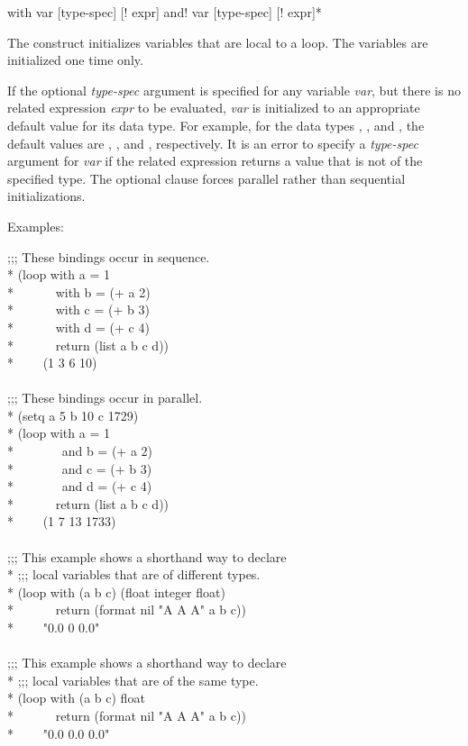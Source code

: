 \begin{defloop}
with var [type-spec] [\!\Xequal! expr] {\!and! var [type-spec] [\!\Xequal! expr]}*

The  construct initializes variables that are local to 
a loop.  The variables are initialized one time only.

If the optional {\it type-spec\/} argument is specified for any variable 
{\it var\/}, but there is no related expression {\it expr} to be evaluated, {\it var\/}
is initialized to an appropriate default value for its data type.
For example, for the data types , , and ,
the default values are , , and , respectively.
It is an error to specify a {\it type-spec\/} argument for {\it var\/} if
the related expression returns a value that is not of the specified type.
The optional  clause forces parallel rather than sequential 
initializations.


Examples:
\begin{lisp}
;;; These bindings occur in sequence. \\*
(loop with a = 1  \\*
~~~~~~with b = (+ a 2)  \\*
~~~~~~with c = (+ b 3) \\*
~~~~~~with d = (+ c 4) \\*
~~~~~~return (list a b c d)) \\*
~~~\EV~(1 3 6 10) \\
 \\
;;; These bindings occur in parallel. \\*
(setq a 5 b 10 c 1729) \\*
(loop with a = 1 \\*
~~~~~~~and b = (+ a 2) \\*
~~~~~~~and c = (+ b 3) \\*
~~~~~~~and d = (+ c 4) \\*
~~~~~~return (list a b c d)) \\*
~~~\EV~(1 7 13 1733) \\
 \\
;;; This example shows a shorthand way to declare \\*
;;; local variables that are of different types. \\*
(loop with (a b c) (float integer float) \\*
~~~~~~return (format nil "{\Xtilde}A {\Xtilde}A {\Xtilde}A" a b c)) \\*
~~~\EV~"0.0 0 0.0" \\
 \\
;;; This example shows a shorthand way to declare \\*
;;; local variables that are of the same type. \\*
(loop with (a b c) float  \\*
~~~~~~return (format nil "{\Xtilde}A {\Xtilde}A {\Xtilde}A" a b c)) \\*
~~~\EV~"0.0 0.0 0.0"
\end{lisp}
\end{defloop}


